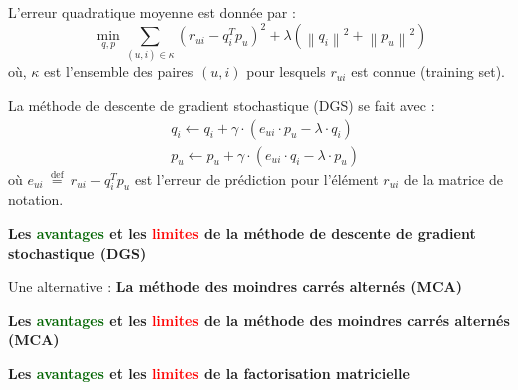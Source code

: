 \begin{frame}{\PartieI}
    L'erreur quadratique moyenne est donnée par :
    \begin{equation*}
        \min _{q, p} \sum_{(u, i) \in \kappa}\left(r_{u i}-q_i^T p_u\right)^2+\lambda\left(\left\|q_i\right\|^2+\left\|p_u\right\|^2\right)
    \end{equation*}
    où, $\kappa$ est l'ensemble des paires $(u,i)$ pour lesquels $r_{ui}$ est connue (training set).
\end{frame}

\begin{frame}{\PartieI}
    La méthode de descente de gradient stochastique (DGS) se fait avec :
    \begin{equation*}
        \begin{aligned}
             & q_i \leftarrow q_i+\gamma \cdot\left(e_{u i} \cdot p_u-\lambda \cdot q_i\right) \\
             & p_u \leftarrow p_u+\gamma \cdot\left(e_{u i} \cdot q_i-\lambda \cdot p_u\right)
        \end{aligned}
    \end{equation*}
    où $e_{u i}{\stackrel{\text { def }}{=}} r_{u i}-q_i^T p_u$ est l'erreur de prédiction pour l'élément $r_{ui}$ de la matrice de notation.
\end{frame}

\begin{frame}{\PartieI}
    \begin{center}
        \textbf{\large{Les \textcolor{darkgreen}{avantages} et les \textcolor{red}{limites} de la méthode de descente de gradient stochastique (DGS)}}
    \end{center}
\end{frame}

\begin{frame}{\PartieI}
    \begin{center}
        \large{Une alternative : \textbf{La méthode des moindres carrés alternés (MCA)}}
    \end{center}
\end{frame}

\begin{frame}{\PartieI}
    \begin{center}
        \textbf{\large{Les \textcolor{darkgreen}{avantages} et les \textcolor{red}{limites} de la méthode des moindres carrés alternés (MCA)}}
    \end{center}
\end{frame}

\begin{frame}{\PartieI}
    \begin{center}
        \textbf{\large{Les \textcolor{darkgreen}{avantages} et les \textcolor{red}{limites} de la factorisation matricielle}}
    \end{center}
\end{frame}
